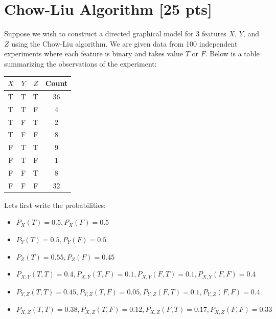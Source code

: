 \documentclass[a4paper]{article}
\theoremstyle{definition}
\newenvironment{soln}{
	\leavevmode\color{blue}\ignorespaces
}{}
\begin{document}
\section{Chow-Liu Algorithm [25 pts]}
Suppose we wish to construct a directed graphical model for 3 features $X$, $Y$, and $Z$ using the Chow-Liu algorithm. We are given data from 100 independent experiments where each feature is binary and takes value $T$ or $F$. Below is a table summarizing the observations of the experiment:

\begin{table}[H]
        \centering
                \begin{tabular}{cccc}
                           $X$ & $Y$ & $Z$ & Count \\
                                \hline
                                T & T & T & 36 \\
                                \hline
                                T & T & F & 4 \\
                                \hline
                                T & F & T & 2 \\
                                \hline
                                T & F & F & 8 \\
                                \hline
                                F & T & T & 9 \\
                                \hline
                                F & T & F & 1 \\
                                \hline
                                F & F & T & 8 \\
                                \hline
                                F & F & F & 32 \\
                                \hline
                \end{tabular}
\end{table}
    \begin{soln}
        Lets first write the probabilities:
        \begin{itemize}
            \item $P_X(T)=0.5,P_X(F)=0.5$
            \item $P_Y(T)=0.5,P_Y(F)=0.5$
            \item $P_Z(T)=0.55,P_Z(F)=0.45$
            \item $P_{X,Y}(T,T)=0.4,P_{X,Y}(T,F)=0.1,P_{X,Y}(F,T)=0.1,P_{X,Y}(F,F)=0.4$
            \item $P_{Y,Z}(T,T)=0.45,P_{Y,Z}(T,F)=0.05,P_{Y,Z}(F,T)=0.1,P_{Y,Z}(F,F)=0.4$
            \item $P_{X,Z}(T,T)=0.38,P_{X,Z}(T,F)=0.12,P_{X,Z}(F,T)=0.17,P_{X,Z}(F,F)=0.33$
        \end{itemize}
    \end{soln}
\end{document}
